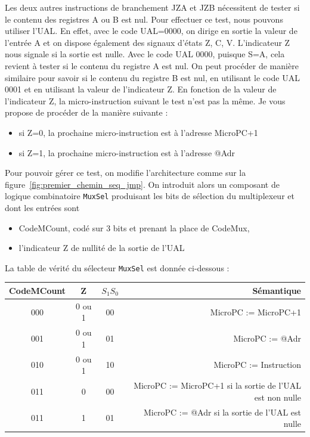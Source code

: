Les deux autres instructions de branchement JZA et JZB nécessitent de tester si le contenu des registres A ou B est nul. Pour effectuer ce test, nous pouvons utiliser l'UAL. En effet, avec le code UAL=0000, on dirige en sortie la valeur de l'entrée A et on dispose également des signaux d'états Z, C, V. L'indicateur Z nous signale si la sortie est nulle. Avec le code UAL 0000, puisque S=A, cela revient à tester si le contenu du registre A est nul. On peut procéder de manière similaire pour savoir si le contenu du registre B est nul, en utilisant le code UAL 0001 et en utilisant la valeur de l'indicateur Z. En fonction de la valeur de l'indicateur Z, la micro-instruction suivant le test n'est pas la même. Je vous propose de procéder de la manière suivante :
\begin{itemize}
\item si Z=0, la prochaine micro-instruction est à l'adresse MicroPC+1
\item si Z=1, la prochaine micro-instruction est à l'adresse @Adr
\end{itemize}

Pour pouvoir gérer ce test, on modifie l'architecture comme sur la figure~\ref{fig:premier_chemin_seq_jmp}. On introduit alors un composant de logique combinatoire \texttt{MuxSel} produisant les bits de sélection du multiplexeur et dont les entrées sont 
\begin{itemize}
\item CodeMCount, codé sur 3 bits et prenant la place de CodeMux,
\item l'indicateur Z de nullité de la sortie de l'UAL
\end{itemize}

La table de vérité du sélecteur \texttt{MuxSel} est donnée ci-dessous :

\begin{tabular}{cc|cr}
CodeMCount & Z & $S_1S_0$ & Sémantique\\
\hline
000 &  0 ou 1 & 00 & MicroPC := MicroPC+1\\
001 &  0 ou 1 & 01 & MicroPC := @Adr\\
010 &  0 ou 1 & 10 & MicroPC := Instruction\\
011 &  0 & 00 & MicroPC := MicroPC+1  si la sortie de l'UAL est non nulle\\
011 &  1 & 01 & MicroPC := @Adr si la sortie de l'UAL est nulle
\end{tabular}

